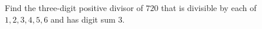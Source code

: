 Find the three-digit positive divisor of $720$ that is divisible by each of $1,2,3,4,5,6$ and has digit sum $3$.
